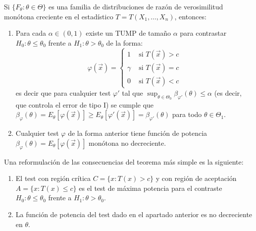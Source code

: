\begin{teorema}
    Si $\{F_\theta : \theta \in \Theta\}$ es una familia de distribuciones de razón de verosimilitud monótona creciente en el estadístico $T  = T(X_1, \ldots, X_n)$, entonces: 
    \begin{enumerate}
        \item Para cada $\alpha \in (0,1)$ existe un TUMP de tamaño $\alpha$ para contrastar $H_0: \theta \leq \theta_0$ frente a $H_1: \theta > \theta_0$ de la forma:
        $$\varphi(\vec{x}) = \begin{cases} 1 & \text{ si } T(\vec{x}) > c \\ \gamma & \text{ si } T(\vec{x}) = c \\ 0 & \text{ si } T(\vec{x}) < c \end{cases}$$
        es decir que para cualquier test $\varphi\prime$ tal que $\sup_{\theta \in \Theta_0} \beta_{\varphi\prime}(\theta) \leq \alpha$ (es decir, que controla el error de tipo I) se cumple que $\beta_{\varphi}(\theta) = E_{\theta}[\varphi(\vec{x})] \geq E_{\theta}[\varphi\prime(\vec{x})] = \beta_{\varphi\prime}(\theta) $ para todo $\theta \in \Theta_1$.
        \item Cualquier test $\varphi$ de la forma anterior tiene función de potencia $\beta_{\varphi}(\theta) = E_{\theta}[\varphi(\vec{x})]$ monótona no decreciente. 
    \end{enumerate}
    Una reformulación de las consecuencias del teorema más simple es la siguiente:
    \begin{enumerate}
        \item El test con región crítica $C = \{x : T(x) > c\}$ y con región de aceptación $A = \{x : T(x) \leq c\}$ es el test de máxima potencia para el contraste $H_0: \theta \leq \theta_0$ frente a $H_1: \theta > \theta_0$.
        \item La función de potencia del test dado en el apartado anterior es no decreciente en $\theta$.
    \end{enumerate}
\end{teorema}

